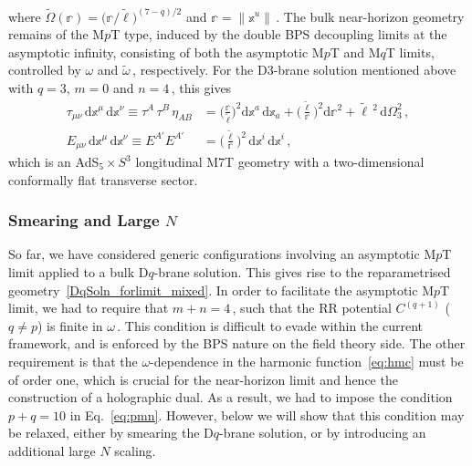 \documentclass[11pt]{article}
\renewcommand{\tilde}[1]{\widetilde{#1}}
\newcommand{\dd}{\mathrm{d}}
\newcommand{\lbb}{\tilde{\ell}}
\begin{document}
%
where $\tilde{\mathbb{\Omega}} (\mathbb{r}) = \bigl(\mathbb{r}/\lbb \bigr)^{(7-q)/2}$ and $\mathbb{r} = \| \mathbb{x}^u \|$\,.
%
The bulk near-horizon geometry remains of the M$p$T type, induced by the double BPS decoupling limits at the asymptotic infinity, consisting of both the asymptotic M$p$T and M$q$T limits, controlled by $\omega$ and $\tilde{\omega}$\,, respectively. 
For the D3-brane solution mentioned above with $q=3$, $m=0$ and $n=4$\,, this gives
\begin{subequations}
    \begin{align}
    \tau^{}_{\mu\nu} \, \dd \mathbb{x}^\mu \, \dd \mathbb{x}^\nu \equiv  \tau^A \,  \tau^B \, \eta^{}_{AB} &= \bigg(\frac{\mathbb{r}}{\tilde{\ell}}\bigg)^{\!\!2} \dd \mathbb{x}^a \, \dd \mathbb{x}_a + \bigg(\frac{\tilde{\ell}}{\mathbb{r}}\bigg)^{\!\!2} \dd \mathbb{r}^2 + \tilde{\ell}\,{}^2\,\dd\Omega_3^2\,,\\[4pt]
    E_{\mu\nu} \, \dd \mathbb{x}^\mu \, \dd \mathbb{x}^\nu \equiv E^{A'} E^{A'} &= \bigg(\frac{\tilde{\ell}}{\mathbb{r}}\bigg)^{\!\!2}\,\dd \mathbb{x}^i \, \dd \mathbb{x}^i\,,
\end{align}
\end{subequations}
which is an AdS${}_5 \times S^3$ longitudinal M7T geometry with a two-dimensional conformally flat transverse sector.

\subsubsection{Smearing and Large \texorpdfstring{$N$}{N}} \label{sec:sln}

So far, we have considered generic configurations involving an asymptotic M$p$T limit applied to a bulk D$q$-brane solution. This gives rise to the reparametrised geometry~\eqref{DqSoln_forlimit_mixed}. In order to facilitate the asymptotic M$p$T limit, we had to require that $m + n =4$\,, such that the RR potential $C^{(q+1)}$ ($q \neq p$) is finite in $\omega$\,. This condition is difficult to evade within the current framework, and is enforced by the BPS nature on the field theory side. The other requirement is that the $\omega$-dependence in the harmonic function~\eqref{eq:hmc} must be of order one, which is crucial for the near-horizon limit and hence the construction of a holographic dual. As a result, we had to impose the condition $p + q = 10$ in Eq.~\eqref{eq:pmn}. However, below we will show that this condition may be relaxed, either by smearing the D$q$-brane solution, or by introducing an additional large $N$ scaling. 
\end{document}
